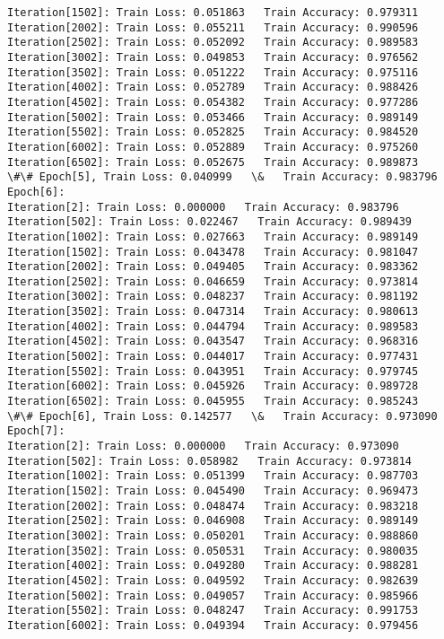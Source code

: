 \documentclass[11pt]{article}
\begin{document}
\begin{Verbatim}[commandchars=\\\{\}]
Iteration[1502]: Train Loss: 0.051863   Train Accuracy: 0.979311 
Iteration[2002]: Train Loss: 0.055211   Train Accuracy: 0.990596 
Iteration[2502]: Train Loss: 0.052092   Train Accuracy: 0.989583 
Iteration[3002]: Train Loss: 0.049853   Train Accuracy: 0.976562 
Iteration[3502]: Train Loss: 0.051222   Train Accuracy: 0.975116 
Iteration[4002]: Train Loss: 0.052789   Train Accuracy: 0.988426 
Iteration[4502]: Train Loss: 0.054382   Train Accuracy: 0.977286 
Iteration[5002]: Train Loss: 0.053466   Train Accuracy: 0.989149 
Iteration[5502]: Train Loss: 0.052825   Train Accuracy: 0.984520 
Iteration[6002]: Train Loss: 0.052889   Train Accuracy: 0.975260 
Iteration[6502]: Train Loss: 0.052675   Train Accuracy: 0.989873 
\#\# Epoch[5], Train Loss: 0.040999   \&   Train Accuracy: 0.983796
Epoch[6]:
Iteration[2]: Train Loss: 0.000000   Train Accuracy: 0.983796 
Iteration[502]: Train Loss: 0.022467   Train Accuracy: 0.989439 
Iteration[1002]: Train Loss: 0.027663   Train Accuracy: 0.989149 
Iteration[1502]: Train Loss: 0.043478   Train Accuracy: 0.981047 
Iteration[2002]: Train Loss: 0.049405   Train Accuracy: 0.983362 
Iteration[2502]: Train Loss: 0.046659   Train Accuracy: 0.973814 
Iteration[3002]: Train Loss: 0.048237   Train Accuracy: 0.981192 
Iteration[3502]: Train Loss: 0.047314   Train Accuracy: 0.980613 
Iteration[4002]: Train Loss: 0.044794   Train Accuracy: 0.989583 
Iteration[4502]: Train Loss: 0.043547   Train Accuracy: 0.968316 
Iteration[5002]: Train Loss: 0.044017   Train Accuracy: 0.977431 
Iteration[5502]: Train Loss: 0.043951   Train Accuracy: 0.979745 
Iteration[6002]: Train Loss: 0.045926   Train Accuracy: 0.989728 
Iteration[6502]: Train Loss: 0.045955   Train Accuracy: 0.985243 
\#\# Epoch[6], Train Loss: 0.142577   \&   Train Accuracy: 0.973090
Epoch[7]:
Iteration[2]: Train Loss: 0.000000   Train Accuracy: 0.973090 
Iteration[502]: Train Loss: 0.058982   Train Accuracy: 0.973814 
Iteration[1002]: Train Loss: 0.051399   Train Accuracy: 0.987703 
Iteration[1502]: Train Loss: 0.045490   Train Accuracy: 0.969473 
Iteration[2002]: Train Loss: 0.048474   Train Accuracy: 0.983218 
Iteration[2502]: Train Loss: 0.046908   Train Accuracy: 0.989149 
Iteration[3002]: Train Loss: 0.050201   Train Accuracy: 0.988860 
Iteration[3502]: Train Loss: 0.050531   Train Accuracy: 0.980035 
Iteration[4002]: Train Loss: 0.049280   Train Accuracy: 0.988281 
Iteration[4502]: Train Loss: 0.049592   Train Accuracy: 0.982639 
Iteration[5002]: Train Loss: 0.049057   Train Accuracy: 0.985966 
Iteration[5502]: Train Loss: 0.048247   Train Accuracy: 0.991753 
Iteration[6002]: Train Loss: 0.049394   Train Accuracy: 0.979456 

\end{Verbatim}
\end{document}
